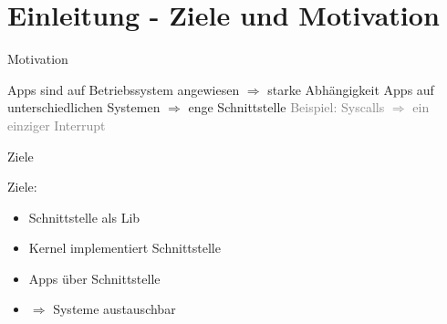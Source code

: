 \section{Einleitung - Ziele und Motivation}


\begin{frame}{Motivation}
    \begin{Large}
        Apps sind auf Betriebssystem angewiesen \newline
        $\Rightarrow$ starke Abhängigkeit \newline
        \newline
        Apps auf unterschiedlichen Systemen \newline
        $\Rightarrow$ enge Schnittstelle \newline
        \newline
        \textcolor{gray}{Beispiel: Syscalls $\Rightarrow$ ein einziger Interrupt}
    \end{Large}
\end{frame}


\begin{frame}{Ziele}
    \begin{Large}
        Ziele:
    \end{Large}
    \vspace{15pt}

    \begin{itemize}
        \item Schnittstelle als Lib
        \item Kernel implementiert Schnittstelle
        \item Apps über Schnittstelle
        \item [] \quad $\Rightarrow$ Systeme austauschbar
    \end{itemize}
\end{frame}


